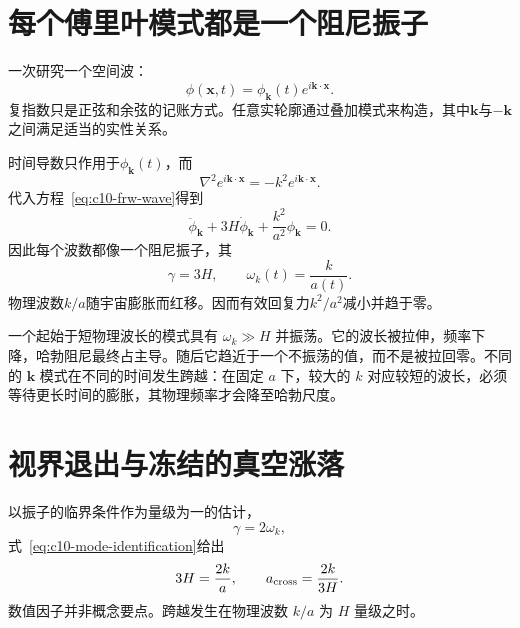 \begin{classroomqa}
\end{classroomqa}

\section{每个傅里叶模式都是一个阻尼振子}

一次研究一个空间波：
\begin{equation}
\phi(\mathbf x,t)
=\phi_{\mathbf k}(t)e^{i\mathbf k\cdot\mathbf x}.
\label{eq:c10-mode-ansatz}
\end{equation}
复指数只是正弦和余弦的记账方式。任意实轮廓通过叠加模式来构造，其中\(\mathbf k\)与\(-\mathbf k\)之间满足适当的实性关系。

时间导数只作用于\(\phi_{\mathbf k}(t)\)，而
\[
\nabla^2e^{i\mathbf k\cdot\mathbf x}
=-k^2e^{i\mathbf k\cdot\mathbf x}.
\]
代入方程~\eqref{eq:c10-frw-wave}得到
\begin{equation}
\ddot\phi_{\mathbf k}
+3H\dot\phi_{\mathbf k}
+\frac{k^2}{a^2}\phi_{\mathbf k}=0.
\label{eq:c10-mode-equation}
\end{equation}
因此每个波数都像一个阻尼振子，其
\begin{equation}
\gamma=3H,
\qquad
\omega_k(t)=\frac{k}{a(t)}.
\label{eq:c10-mode-identification}
\end{equation}
物理波数\(k/a\)随宇宙膨胀而红移。因而有效回复力\(k^2/a^2\)减小并趋于零。

一个起始于短物理波长的模式具有 \(\omega_k\gg H\) 并振荡。它的波长被拉伸，频率下降，哈勃阻尼最终占主导。随后它趋近于一个不振荡的值，而不是被拉回零。不同的 \(\mathbf k\) 模式在不同的时间发生跨越：在固定 \(a\) 下，较大的 \(k\) 对应较短的波长，必须等待更长时间的膨胀，其物理频率才会降至哈勃尺度。

\section{视界退出与冻结的真空涨落}

以振子的临界条件作为量级为一的估计，
\[
\gamma=2\omega_k,
\]
式~\eqref{eq:c10-mode-identification}给出
\begin{equation}
3H=\frac{2k}{a},
\qquad
a_{\rm cross}=\frac{2k}{3H}.
\label{eq:c10-critical-mode}
\end{equation}
数值因子并非概念要点。跨越发生在物理波数 \(k/a\) 为 \(H\) 量级之时。

